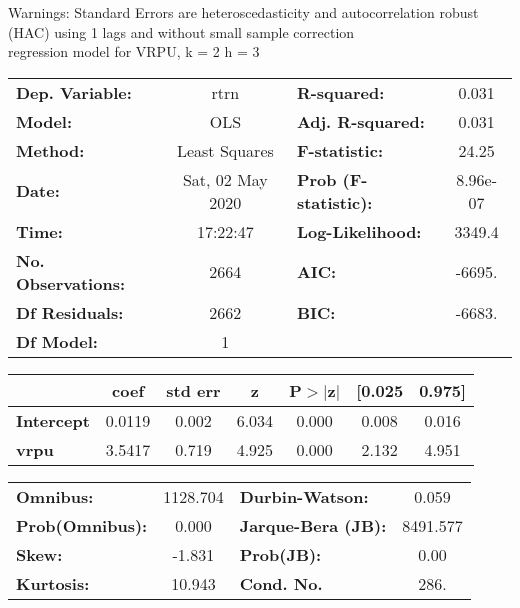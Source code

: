 Warnings: \newline
 [1] Standard Errors are heteroscedasticity and autocorrelation robust (HAC) using 1 lags and without small sample correction\\ 

regression model for VRPU, k = 2 h = 3\begin{center}
\begin{tabular}{lclc}
\toprule
\textbf{Dep. Variable:}    &       rtrn       & \textbf{  R-squared:         } &     0.031   \\
\textbf{Model:}            &       OLS        & \textbf{  Adj. R-squared:    } &     0.031   \\
\textbf{Method:}           &  Least Squares   & \textbf{  F-statistic:       } &     24.25   \\
\textbf{Date:}             & Sat, 02 May 2020 & \textbf{  Prob (F-statistic):} &  8.96e-07   \\
\textbf{Time:}             &     17:22:47     & \textbf{  Log-Likelihood:    } &    3349.4   \\
\textbf{No. Observations:} &        2664      & \textbf{  AIC:               } &    -6695.   \\
\textbf{Df Residuals:}     &        2662      & \textbf{  BIC:               } &    -6683.   \\
\textbf{Df Model:}         &           1      & \textbf{                     } &             \\
\bottomrule
\end{tabular}
\begin{tabular}{lcccccc}
                   & \textbf{coef} & \textbf{std err} & \textbf{z} & \textbf{P$> |$z$|$} & \textbf{[0.025} & \textbf{0.975]}  \\
\midrule
\textbf{Intercept} &       0.0119  &        0.002     &     6.034  &         0.000        &        0.008    &        0.016     \\
\textbf{vrpu}      &       3.5417  &        0.719     &     4.925  &         0.000        &        2.132    &        4.951     \\
\bottomrule
\end{tabular}
\begin{tabular}{lclc}
\textbf{Omnibus:}       & 1128.704 & \textbf{  Durbin-Watson:     } &    0.059  \\
\textbf{Prob(Omnibus):} &   0.000  & \textbf{  Jarque-Bera (JB):  } & 8491.577  \\
\textbf{Skew:}          &  -1.831  & \textbf{  Prob(JB):          } &     0.00  \\
\textbf{Kurtosis:}      &  10.943  & \textbf{  Cond. No.          } &     286.  \\
\bottomrule
\end{tabular}
\end{center}

